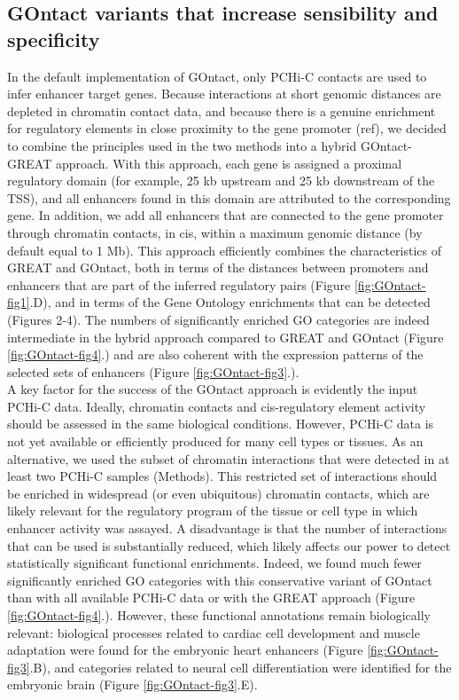 \subsection{GOntact variants that increase sensibility and specificity}
In the default implementation of GOntact, only PCHi-C contacts are used to infer enhancer target genes. Because interactions at short genomic distances are depleted in chromatin contact data, and because there is a genuine enrichment for regulatory elements in close proximity to the gene promoter (ref), we decided to combine the principles used in the two methods into a hybrid GOntact-GREAT approach. With this approach, each gene is assigned a proximal regulatory domain (for example, 25 kb upstream and 25 kb downstream of the TSS), and all enhancers found in this domain are attributed to the corresponding gene. In addition, we add all enhancers that are connected to the gene promoter through chromatin contacts, in cis, within a maximum genomic distance (by default equal to 1 Mb). This approach efficiently combines the characteristics of GREAT and GOntact, both in terms of the distances between promoters and enhancers that are part of the inferred regulatory pairs (Figure \ref{fig:GOntact-fig1}.D), and in terms of the Gene Ontology enrichments that can be detected (Figures 2-4). The numbers of significantly enriched GO categories are indeed intermediate in the hybrid approach compared to GREAT and GOntact (Figure \ref{fig:GOntact-fig4}.) and are also coherent with the expression patterns of the selected sets of enhancers (Figure \ref{fig:GOntact-fig3}.).\\

A key factor for the success of the GOntact approach is evidently the input PCHi-C data. Ideally, chromatin contacts and \acrshort{cis}-regulatory element activity should be assessed in the same biological conditions. However, PCHi-C data is not yet available or efficiently produced for many cell types or tissues. As an alternative, we used the subset of chromatin interactions that were detected in at least two PCHi-C samples (Methods). This restricted set of interactions should be enriched in widespread (or even ubiquitous) chromatin contacts, which are likely relevant for the regulatory program of the tissue or cell type in which enhancer activity was assayed. A disadvantage is that the number of interactions that can be used is substantially reduced, which likely affects our power to detect statistically significant functional enrichments. Indeed, we found much fewer significantly enriched GO categories with this conservative variant of GOntact than with all available PCHi-C data or with the GREAT approach (Figure \ref{fig:GOntact-fig4}.). However, these functional annotations remain biologically relevant: biological processes related to cardiac cell development and muscle adaptation were found for the embryonic heart enhancers (Figure \ref{fig:GOntact-fig3}.B), and categories related to neural cell differentiation were identified for the embryonic brain (Figure \ref{fig:GOntact-fig3}.E). 

